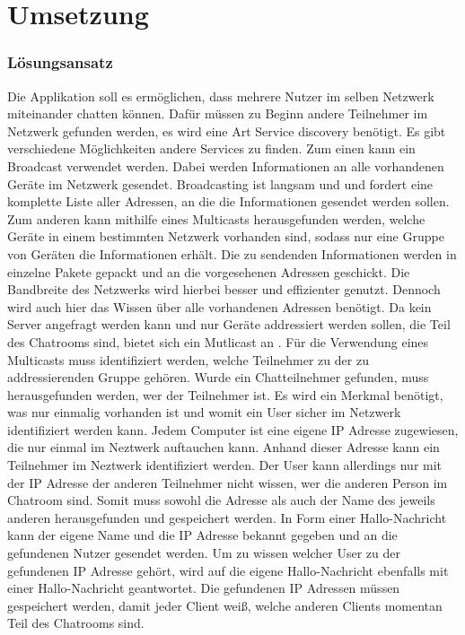 \section{Umsetzung}
\subsubsection{Lösungsansatz} 
Die Applikation soll es ermöglichen, dass mehrere Nutzer im selben Netzwerk miteinander chatten können. 
Dafür müssen zu Beginn andere Teilnehmer im Netzwerk gefunden werden, es wird eine Art Service discovery benötigt.
Es gibt verschiedene Möglichkeiten andere Services zu finden. Zum einen kann ein Broadcast verwendet werden. Dabei werden Informationen an alle vorhandenen Geräte im Netzwerk gesendet.
Broadcasting ist langsam und und fordert eine komplette Liste aller Adressen, an die die Informationen gesendet werden sollen. 
Zum anderen kann mithilfe eines Multicasts herausgefunden werden, welche Geräte in einem bestimmten Netzwerk vorhanden sind, sodass nur eine Gruppe von Geräten die Informationen erhält.
Die zu sendenden Informationen werden in einzelne Pakete gepackt und an die vorgesehenen Adressen geschickt. Die Bandbreite des Netzwerks wird hierbei besser und effizienter genutzt. 
Dennoch wird auch hier das Wissen über alle vorhandenen Adressen benötigt\cite[S. 381]{tan10}. 
Da kein Server angefragt werden kann und nur Geräte addressiert werden sollen, die Teil des Chatrooms sind, bietet sich ein Mutlicast an \cite[S. 382]{tan10}. 
Für die Verwendung eines Multicasts muss identifiziert werden, welche Teilnehmer zu der zu addressierenden Gruppe gehören. 
Wurde ein Chatteilnehmer gefunden, muss herausgefunden werden, wer der Teilnehmer ist. 
Es wird ein Merkmal benötigt, was nur einmalig vorhanden ist und womit ein User sicher im Netzwerk identifiziert werden kann. 
Jedem Computer ist eine eigene IP Adresse zugewiesen, die nur einmal im Neztwerk auftauchen kann. Anhand dieser Adresse kann ein Teilnehmer im Neztwerk identifiziert werden.
Der User kann allerdings nur mit der IP Adresse der anderen Teilnehmer nicht wissen, wer die anderen Person im Chatroom sind. 
Somit muss sowohl die Adresse als auch der Name des jeweils anderen herausgefunden und gespeichert werden. 
In Form einer Hallo-Nachricht kann der eigene Name und die IP Adresse bekannt gegeben und an die gefundenen Nutzer gesendet werden. 
Um zu wissen welcher User zu der gefundenen IP Adresse gehört, wird auf die eigene Hallo-Nachricht ebenfalls mit einer Hallo-Nachricht geantwortet. 
Die gefundenen IP Adressen müssen gespeichert werden, damit jeder Client weiß, welche anderen Clients momentan Teil des Chatrooms sind. 
